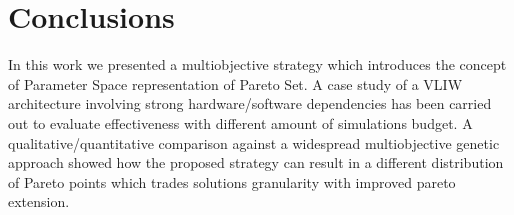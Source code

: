 \documentclass[prodmode,acmtecs]{acmsmall}
\begin{document}
\section{Conclusions}
In this work we presented a multiobjective strategy which 
introduces the concept of Parameter Space representation of Pareto
Set. A case study of a VLIW architecture involving strong
hardware/software dependencies has been carried out to evaluate
effectiveness with different amount of simulations budget.
A qualitative/quantitative comparison against a widespread multiobjective genetic
approach showed how the proposed strategy can result in a different
distribution of Pareto points which trades solutions granularity with
improved pareto extension. 

\balance

 


\end{document}
